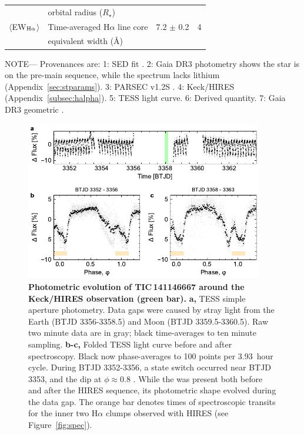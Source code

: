 \documentclass[11pt,twocolumn,tighten]{aastex7}
\begin{document}
\begin{table}
\begin{tabular}{llcc}
                                        & \hspace{3pt} orbital radius ($R_\star$)	                       &                      \\
%
$\langle$EW$_{\rm H\alpha}$$\rangle$    & Time-averaged H$\alpha$ line core                              &  7.2 $\pm$ 0.2   & 4 \\ 
                                        & \hspace{3pt} equivalent width (\AA)	                           &                      \\
\hline
\end{tabular}
\begin{flushleft}
\footnotesize{ \textsc{NOTE}---
Provenances are:
1: SED fit \citep{Bouma2024}.
2: Gaia DR3 photometry shows the star is on the pre-main sequence,
   while the spectrum lacks lithium (Appendix~\ref{sec:stparams}).
3: PARSEC v1.2S \citep{Chen2014}.
4: Keck/HIRES (Appendix~\ref{subsec:halpha}).
5: TESS light curve.
6: Derived quantity.
7: Gaia DR3 geometric \citep{GaiaDR3}.
}
\end{flushleft}
\vspace{-0.5cm}
\end{table}

\begin{figure}[!t]
  \centering
  \includegraphics[width=0.925\textwidth]{f2.pdf}
  \vspace{-0.2cm}
  \caption{{\bf Photometric evolution of TIC\,141146667 around the Keck/HIRES
  observation (green bar).}  {\bf a,} TESS simple aperture photometry.
  Data gaps were caused by stray light from the Earth (BTJD 3356-3358.5) and
  Moon (BTJD 3359.5-3360.5).  Raw two minute data are in gray; black
  time-averages to ten minute sampling.  {\bf b-c,} Folded TESS light
  curve before and after spectroscopy.  Black now phase-averages to
  100 points per 3.93\ hour cycle.  During BTJD 3352-3356, a state
  switch occurred near BTJD 3353, and the dip at $\phi$$\approx$0.8
  .  While the  was present both before and after the HIRES
  sequence, its photometric shape evolved during the data gap.  The
  orange bar denotes times of spectroscopic transits for the inner two
  H$\alpha$ clumps observed with HIRES (see Figure~\ref{fig:spec}).}
  \label{fig:fulllc}
\end{figure}
\end{document}

